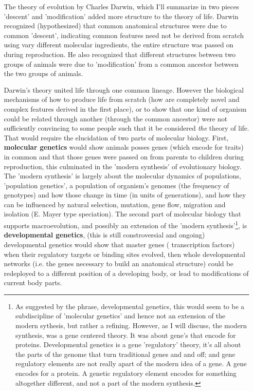 The theory of evolution by Charles Darwin, which I'll summarize in two pieces 'descent' and 'modification' added  more structure to the theory of life.  Darwin recognized (hypothesized) that common anatomical structures were due to common 'descent', indicating common features need not be derived from scratch using vary different molecular ingredients, the entire structure was passed on during reproduction.  He also recognized that different structures between two groups of animals were due to 'modification' from a common ancestor between the two groups of animals.

Darwin's theory united life through one common lineage.  However the biological mechanisms of how to produce life from scratch (how are completely novel and complex features derived in the first place), or to show that one kind of organism could be related through another (through the common ancestor) were not sufficiently convincing to some people such that it be considered \textit{the} theory of life.  That would require the elucidation of two parts of molecular biology.  First, \textbf{molecular genetics} would show animals posses genes (which encode for traits) in common and that those genes were passed on from parents to children during reproduction, this culminated in the 'modern synthesis' of evolutionary biology.  The 'modern synthesis' is largely about the molecular dynamics of populations, 'population genetics', a population of organism's genomes (the frequency of genotypes) and how those change in time (in units of generations), and how they can be influenced by natural selection, mutation, gene flow, migration and isolation (E. Mayer type speciation).  The second part of molecular biology that supports macroevolution, and possibly an extension of the 'modern synthesis'\footnote{As suggested by the phrase, developmental genetics, this would seem to be a subdiscipline of 'molecular genetics' and hence not an extension of the modern sythesis, but rather a refining.  However, as I will discuss, the modern synthesis, was a gene centered theory.  It was about gene's that encode for proteins.  Developmental genetics is a gene 'regulatory' theory, it's all about the parts of the genome that turn traditional genes and and off; and gene regulatory elements are not really apart of the modern idea of a gene.  A gene encodes for a protein.  A genetic regulatory element encodes for something altogether different, and not a part of the modern synthesis.}, is \textbf{developmental genetics}, (this is still constroversial and ongoing) developmental genetics would show that master genes ( transcription factors) when their regulatory targets or binding sites evolved, then whole developmental networks (i.e. the genes necessary to build an anatomical structure) could be redeployed to a different position of a developing body, or lead to modifications of current body parts.  

